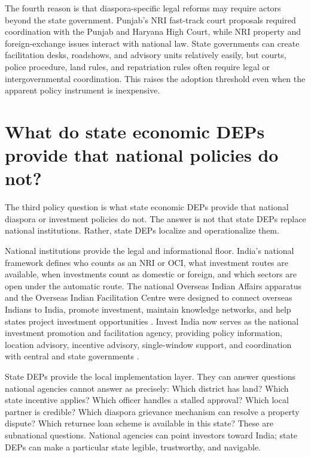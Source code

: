 \documentclass[doublespace,nopageskip]{UVAthesis}
\begin{document}
The fourth reason is that diaspora-specific legal reforms may require actors beyond the state government. Punjab's NRI fast-track court proposals required coordination with the Punjab and Haryana High Court, while NRI property and foreign-exchange issues interact with national law. State governments can create facilitation desks, roadshows, and advisory units relatively easily, but courts, police procedure, land rules, and repatriation rules often require legal or intergovernmental coordination. This raises the adoption threshold even when the apparent policy instrument is inexpensive.

\section{What do state economic DEPs provide that national policies do not?}

The third policy question is what state economic DEPs provide that national diaspora or investment policies do not. The answer is not that state DEPs replace national institutions. Rather, state DEPs localize and operationalize them.

National institutions provide the legal and informational floor. India's national framework defines who counts as an NRI or OCI, what investment routes are available, when investments count as domestic or foreign, and which sectors are open under the automatic route. The national Overseas Indian Affairs apparatus and the Overseas Indian Facilitation Centre were designed to connect overseas Indians to India, promote investment, maintain knowledge networks, and help states project investment opportunities \citep{ministry_of_external_affairs_overview_nodate, high_commission_of_india_dar_es_salaam_high_nodate}. Invest India now serves as the national investment promotion and facilitation agency, providing policy information, location advisory, incentive advisory, single-window support, and coordination with central and state governments \citep{maximize_india_with_maximum_world_about_nodate}.

State DEPs provide the local implementation layer. They can answer questions national agencies cannot answer as precisely: Which district has land? Which state incentive applies? Which officer handles a stalled approval? Which local partner is credible? Which diaspora grievance mechanism can resolve a property dispute? Which returnee loan scheme is available in this state? These are subnational questions. National agencies can point investors toward India; state DEPs can make a particular state legible, trustworthy, and navigable.
\end{document}
